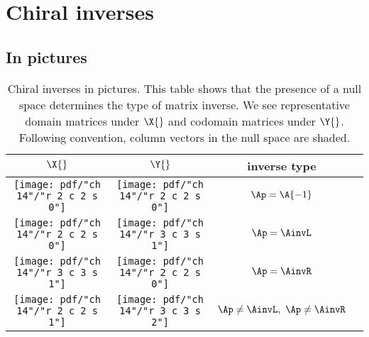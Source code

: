 \section{Chiral inverses}

\subsection{In pictures}
\begin{table}[htdp]
\begin{center}
\begin{tabular}{cccl}
  $\X{}$ & $\Y{}$ & inverse type \\\hline
  \texttt{[image: pdf/"ch 14"/"r 2 c 2 s 0"]} &
  \texttt{[image: pdf/"ch 14"/"r 2 c 2 s 0"]} &
  $\Ap = \A{-1}$ \\[20pt]
  \texttt{[image: pdf/"ch 14"/"r 2 c 2 s 0"]} &
  \texttt{[image: pdf/"ch 14"/"r 3 c 3 s 1"]} &
  $\Ap = \AinvL$ \\[20pt]
  \texttt{[image: pdf/"ch 14"/"r 3 c 3 s 1"]} &
  \texttt{[image: pdf/"ch 14"/"r 2 c 2 s 0"]} &
  $\Ap = \AinvR$ \\[20pt]
  \texttt{[image: pdf/"ch 14"/"r 2 c 2 s 1"]} &
  \texttt{[image: pdf/"ch 14"/"r 3 c 3 s 2"]} &
  $\Ap \ne \AinvL,\ \Ap \ne \AinvR$ \\
\end{tabular}
\end{center}
\label{tab:14:experiment:b}
\caption{Chiral inverses in pictures. This table shows that the presence of a null space determines the type of matrix inverse. We see representative domain matrices under $\X{}$ and codomain matrices under $\Y{}$. Following convention, column vectors in the null space are shaded.}
\end{table}%

